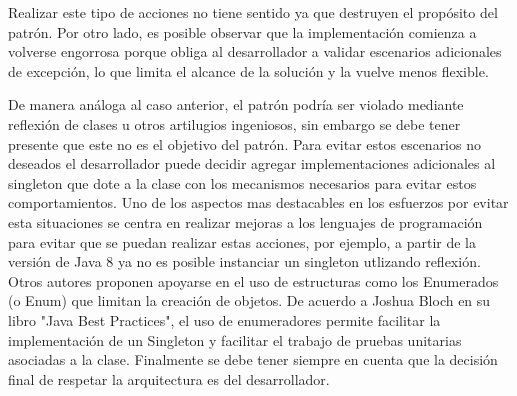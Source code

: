  Realizar este tipo de acciones no tiene sentido ya que destruyen el propósito del patrón. Por otro lado, es posible observar que la implementación comienza a volverse engorrosa porque obliga al desarrollador a validar escenarios adicionales de excepción, lo que limita el alcance de la solución y la vuelve menos flexible.

De manera análoga al caso anterior, el patrón podría ser violado mediante reflexión de clases u otros artilugios ingeniosos, sin embargo se debe tener presente que este no es el objetivo del patrón. Para evitar estos escenarios no deseados el desarrollador puede decidir agregar implementaciones adicionales al singleton que dote a la clase con los mecanismos necesarios para evitar estos comportamientos. Uno de los aspectos mas destacables en los esfuerzos por evitar esta situaciones se centra en realizar mejoras a los lenguajes de programación para evitar que se puedan realizar estas acciones, por ejemplo, a partir de la versión de Java 8 ya no es posible instanciar un singleton utlizando reflexión. Otros autores proponen apoyarse en el uso de estructuras como los Enumerados (o Enum) que limitan la creación de objetos. De acuerdo a Joshua Bloch en su libro "Java Best Practices", el uso de enumeradores permite facilitar la implementación de un Singleton y facilitar el trabajo de pruebas unitarias asociadas a la clase. Finalmente se debe tener siempre en cuenta que la decisión final de respetar la arquitectura es del desarrollador.